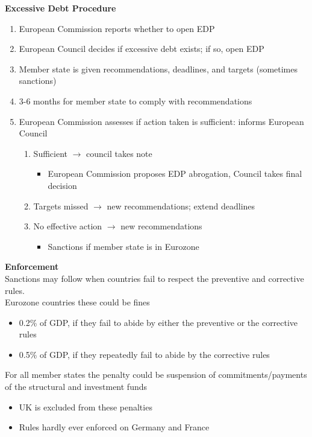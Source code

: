 \documentclass{beamer}
\begin{document}
\begin{frame}
  \textbf{Excessive Debt Procedure}
  \begin{enumerate}
    \item European Commission reports whether to open EDP
    \item European Council decides if excessive debt exists; if so, open EDP
    \item Member state is given recommendations, deadlines, and targets (sometimes sanctions)
    \item 3-6 months for member state to comply with recommendations
    \item European Commission assesses if action taken is sufficient: informs European Council
    \begin{enumerate}[i]
      \item Sufficient $\rightarrow$ council takes note
      \begin{itemize}
        \item European Commission proposes EDP abrogation, Council takes final decision
      \end{itemize}
      \item Targets missed $\rightarrow$ new recommendations; extend deadlines
      \item No effective action $\rightarrow$ new recommendations
      \begin{itemize}
        \item Sanctions if member state is in Eurozone
      \end{itemize}
    \end{enumerate}
  \end{enumerate}
\end{frame}


\begin{frame}
  \textbf{Enforcement}\\
   Sanctions may follow when countries fail to respect the preventive and corrective rules.\\
   Eurozone countries these could be fines
    \begin{itemize}
      \item 0.2\% of GDP, if they fail to abide by either the preventive or the corrective rules
      \item 0.5\% of GDP, if they repeatedly fail to abide by the corrective rules
    \end{itemize}
    \medskip
    For all member states the penalty could be suspension of commitments/payments of the structural and investment funds
    \begin{itemize}
      \item UK is excluded from these penalties
      \item Rules hardly ever enforced on Germany and France
    \end{itemize}    
\end{frame}
\end{document}
